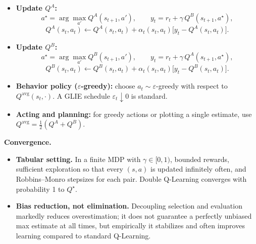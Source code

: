 \documentclass[
]{book}
\theoremstyle{definition}
\theoremstyle{definition}
\theoremstyle{definition}
\theoremstyle{definition}
\theoremstyle{remark}
\begin{document}
\begin{itemize}
\item
  \textbf{Update \(Q^A\):}
  \[
  a^\star = \arg\max_{a'} Q^A(s_{t+1}, a'),\qquad
  y_t = r_{t} + \gamma\, Q^B(s_{t+1}, a^\star),
  \]
  \[
  Q^A(s_t, a_t) \leftarrow Q^A(s_t, a_t) + \alpha_t(s_t,a_t)\big[y_t - Q^A(s_t, a_t)\big].
  \]
\item
  \textbf{Update \(Q^B\):}
  \[
  a^\star = \arg\max_{a'} Q^B(s_{t+1}, a'),\qquad
  y_t = r_{t} + \gamma\, Q^A(s_{t+1}, a^\star),
  \]
  \[
  Q^B(s_t, a_t) \leftarrow Q^B(s_t, a_t) + \alpha_t(s_t,a_t)\big[y_t - Q^B(s_t, a_t)\big].
  \]
\item
  \textbf{Behavior policy (\(\varepsilon\)-greedy):} choose \(a_t \sim \varepsilon\)-greedy with respect to \(Q^{\text{avg}}(s_t,\cdot)\).
  A GLIE schedule \(\varepsilon_t \downarrow 0\) is standard.
\item
  \textbf{Acting and planning:} for greedy actions or plotting a single estimate, use \(Q^{\text{avg}} = \tfrac12(Q^A+Q^B)\).
\end{itemize}

\textbf{Convergence.}

\begin{itemize}
\item
  \textbf{Tabular setting.} In a finite MDP with \(\gamma \in [0,1)\), bounded rewards, sufficient exploration so that every \((s,a)\) is updated infinitely often, and Robbins--Monro stepsizes for each pair. Double Q-Learning converges with probability 1 to \(Q^\star\).
\item
  \textbf{Bias reduction, not elimination.} Decoupling selection and evaluation markedly reduces overestimation; it does not guarantee a perfectly unbiased max estimate at all times, but empirically it stabilizes and often improves learning compared to standard Q-Learning.
\end{itemize}
\end{document}
